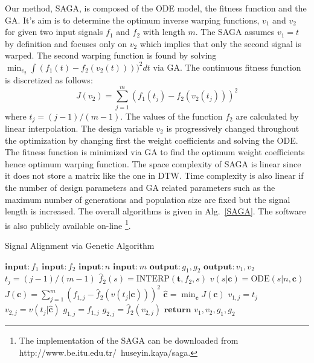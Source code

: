 \documentclass[number,1p,12pt]{elsarticle}
\begin{document}
Our method, SAGA, is composed of the ODE model, the fitness function and the GA. It's aim is to determine the optimum inverse warping functions, $v_1$ and $v_2$ for given two input signals $f_1$ and $f_2$ with length $m$. The SAGA assumes $v_1 = t$ by definition and focuses only on $v_2$ which implies that only the second signal is warped. The second warping function is found by solving $\min_{v_2} \int (f_1(t)-f_2(v_2(t))))^2dt$ via GA. The continuous fitness function is discretized as follows:
\begin{equation}
J(v_2) = \sum_{j=1}^m \left( f_1(t_j) - f_2(v_2(t_j))\right)^2
\end{equation}
where $t_j = (j-1)/(m-1)$. The values of the function $f_2$ are calculated by linear interpolation. The design variable $v_2$ is progressively changed throughout the optimization by changing first the weight coefficients and solving the ODE. The fitness function is minimized via GA to find the optimum weight coefficients hence optimum warping function. The space complexity of SAGA is linear since it does not store a matrix like the one in DTW. Time complexity is also linear if the number of design parameters and GA related parameters such as the maximum number of generations and population size are fixed but the signal length is increased. The overall algorithms is given in Alg.~\ref{SAGA}. The software is also publicly available on-line \footnote{The implementation of the SAGA can be downloaded from http://www.be.itu.edu.tr/~huseyin.kaya/saga.}.
\begin{algorithm}
\caption{Signal Alignment via Genetic Algorithm}\label{SAGA}
\begin{algorithmic}[1]
 \State $\textbf{input}: f_1$ 
 \State $\textbf{input}: f_2$ 
 \State $\textbf{input}: n$ 
 \State $\textbf{input}: m$ 
 \State $\textbf{output}: g_1,g_2$ 
 \State $\textbf{output}: v_1,v_2$ 
 \State $t_j=(j-1)/(m-1)$ 
 \State $\hat{f}_2(s) = \mbox{INTERP}(\mathbf{t},f_2,s)$ 
 \State $v(s|\mathbf{c}) = \mbox{ODE}(s|n,\mathbf{c})$ 
 \State $J(\mathbf{c}) = \sum_{j=1}^m (f_{1,j}-\hat{f}_2(v(t_j|\mathbf{c})))^2$ 
 \State $\hat{\mathbf{c}} = \min_{\mathbf{c}} J(\mathbf{c})$ 
 \State $v_{1,j} = t_j$ 
 \State $v_{2,j} =  v(t_j|\hat{\mathbf{c}})$ 
 \State $g_{1,j} = f_{1,j}$ 
 \State $g_{2,j} = \hat{f}_2(v_{2,j})$ 
 \State $\textbf{return}$ $v_1,v_2,g_1,g_2$  
 \EndProcedure
 \end{algorithmic}
\end{algorithm}
\end{document}
